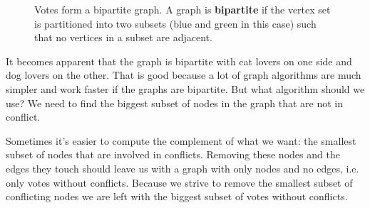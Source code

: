 \begin{figure}[t]
    \caption{Votes form a bipartite graph. A graph is \textbf{bipartite} if the vertex set is partitioned into two subsets (blue and green in this case) such that no vertices in a subset are adjacent.}
	\label{votes_conflict}
\end{figure}

It becomes apparent that the graph is bipartite with cat lovers on one side and dog lovers on the other. That is good because a lot of graph algorithms are much simpler and work faster if the graphs are bipartite. But what algorithm should we use? We need to find the biggest subset of nodes in the graph that are not in conflict. 

Sometimes it's easier to compute the complement of what we want: the smallest subset of nodes that are involved in conflicts. Removing these nodes and the edges they touch should leave us with a graph with only nodes and no edges, i.e. only votes without conflicts. Because we strive to remove the smallest subset of conflicting nodes we are left with the biggest subset of votes without conflicts.

